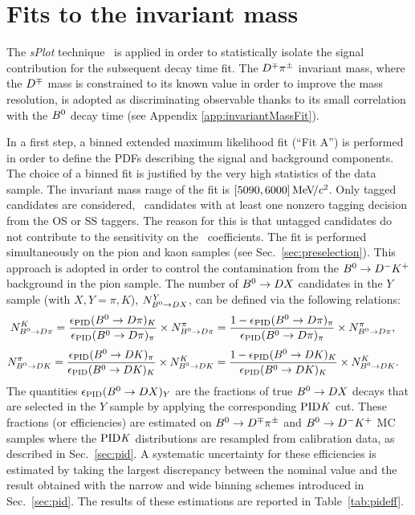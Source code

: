\section[Fits to the $B^0$ invariant mass]{Fits to the  invariant mass}
\label{sec:massfit}

The \emph{sPlot} technique~\cite{sPlot} is applied in order to statistically
isolate the signal contribution for the subsequent decay time fit. The $D^\mp\pi^\pm$ invariant
mass, where the $D^\mp$ mass is constrained to its known value in order to improve
the mass resolution, is adopted as discriminating observable thanks to its small
correlation with the $B^0$ decay time (see Appendix \ref{app:invariantMassFit}).

In a first step, a binned extended maximum likelihood fit (``Fit A'') is
performed in order to define the PDFs describing the  signal and background
components. The choice of a binned fit is justified by the very high statistics
of the data sample. The invariant mass range of the fit is $[5090,6000]{\mathrm{\,Me\kern -0.1em V\!/}c^2}$.
Only tagged candidates are considered, \ie~candidates with at least one nonzero tagging
decision from the OS or SS taggers. The reason for this is that untagged candidates do
not contribute to the sensitivity on the \CP~coefficients.
The fit is performed simultaneously on the pion and kaon samples (see
Sec.~\ref{sec:preselection}). This approach is adopted in order to control the
contamination from the $B^0\rightarrow D^-K^+$  background  in the pion sample. The number of
$B^0\rightarrow DX$ candidates in the $Y$ sample (with $X,Y=\pi,K$), $N^{Y}_{B^0\rightarrow
DX}$, can be defined via the following relations:
%
\begin{equation}
	\label{eq:Bd2DPiconstr}
	\begin{split}
		N^{K}_{B^0\rightarrow D\pi}
		&= \frac{\epsilon_{\rm PID}(B^0\rightarrow D\pi)_{K}}{\epsilon_{\rm PID}(B^0\rightarrow D\pi)_{\pi}}\times N^{\pi}_{B^0\rightarrow D\pi}  = \frac{1-\epsilon_{\rm PID}(B^0\rightarrow D\pi)_{\pi}}{\epsilon_{\rm PID}(B^0\rightarrow D\pi)_{\pi}}\times N^{\pi}_{B^0\rightarrow D\pi},
	\end{split}
\end{equation}
\begin{equation}
	\label{eq:Bd2DKconstr}
	\begin{split}
		N^{\pi}_{B^0\rightarrow DK}
		&= \frac{\epsilon_{\rm PID}(B^0\rightarrow DK)_{\pi}}{\epsilon_{\rm PID}(B^0\rightarrow DK)_{K}}\times N^{K}_{B^0\rightarrow DK} = \frac{1-\epsilon_{\rm PID}(B^0\rightarrow DK)_{K}}{\epsilon_{\rm PID}(B^0\rightarrow DK)_{K}}\times N^{K}_{B^0\rightarrow DK}.
	\end{split}
\end{equation}
%
The quantities $\epsilon_{\rm PID}(B^0\rightarrow DX)_{Y}$ are the fractions of true
$B^0\rightarrow DX$ decays that are selected in the $Y$ sample by applying the
corresponding $\rm{PID}\it{K}$ cut. These fractions (or efficiencies) are estimated on $B^0\rightarrow
D^\mp\pi^\pm$ and $B^0\rightarrow D^-K^+$ MC samples where the $\rm{PID}\it{K}$ distributions are
resampled from calibration data, as described in Sec.~\ref{sec:pid}. 
A systematic uncertainty for these efficiencies is estimated by taking the largest
discrepancy between the nominal value and the result obtained with the narrow and wide
binning schemes introduced in Sec.~\ref{sec:pid}.
The results
of these estimations are reported in Table~\ref{tab:pideff}.

